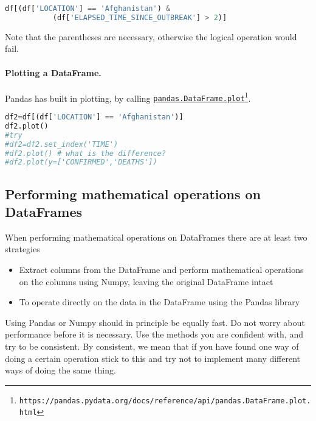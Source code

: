 \documentclass[graybox,sectrefs,envcountresetchap,open=right,final]{svmonodo}
\newenvironment{graybox2admon}[1][]{
\begin{graybox2mdframed}[frametitle=#1]
}
{
\end{graybox2mdframed}
}
\begin{document}
\begin{lstlisting}[language=python,style=blue1bar]
df[(df['LOCATION'] == 'Afghanistan') &
		   (df['ELAPSED_TIME_SINCE_OUTBREAK'] > 2)]

\end{lstlisting}

Note that the parentheses are necessary, otherwise the logical operation would fail.

\paragraph{Plotting a DataFrame.}
Pandas has built in plotting, by calling \href{{https://pandas.pydata.org/docs/reference/api/pandas.DataFrame.plot.html}}{\nolinkurl{pandas.DataFrame.plot}\footnote{\texttt{https://pandas.pydata.org/docs/reference/api/pandas.DataFrame.plot.html}}}.







\begin{lstlisting}[language=python,style=blue1bar]
df2=df[(df['LOCATION'] == 'Afghanistan')]
df2.plot()
#try 
#df2=df2.set_index('TIME')
#df2.plot() # what is the difference?
#df2.plot(y=['CONFIRMED','DEATHS'])

\end{lstlisting}

\subsection{Performing mathematical operations on DataFrames}
When performing mathematical operations on DataFrames there are at least two strategies
\begin{itemize}
\item Extract columns from the DataFrame and perform mathematical operations on the columns using Numpy, leaving the original DataFrame intact

\item To operate directly on the data in the DataFrame using the Pandas library
\end{itemize}

\noindent


\begin{graybox2admon}[Speed and performance]
Using Pandas or Numpy should in principle be equally fast. Do not worry about performance before it is necessary. Use the methods you are confident with, and try to be consistent. By consistent, we mean that if you have found one way of doing a certain operation stick to this and try not to implement many different ways of doing the same thing.
\end{graybox2admon}
\end{document}
